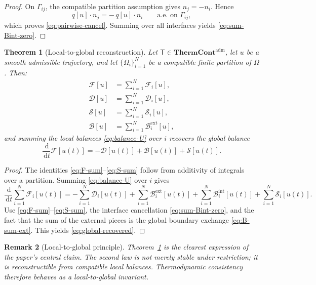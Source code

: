 \documentclass[11pt]{article}
\newtheorem{theorem}{Theorem}[section]
\newtheorem{remark}[theorem]{Remark}
\newcommand{\Om}{\Omega}
\newcommand{\dd}{\,\mathrm{d}}
\newcommand{\F}{\mathcal{F}}
\newcommand{\Diss}{\mathcal{D}}
\newcommand{\Bnd}{\mathcal{B}}
\newcommand{\Src}{\mathcal{S}}
\newcommand{\ThermAdm}{\mathbf{ThermCont}^{\mathrm{adm}}}
\begin{document}
\begin{proof}
On \(\Gamma_{ij}\), the compatible partition assumption gives \(n_j=-n_i\). Hence
\[
q[u]\cdot n_j = -\,q[u]\cdot n_i
\qquad \text{a.e. on }\Gamma_{ij},
\]
which proves \eqref{eq:pairwise-cancel}. Summing over all interfaces yields
\eqref{eq:sum-Bint-zero}.
\end{proof}

\begin{theorem}[Local-to-global reconstruction]\label{thm:local-to-global}
Let \(\mathsf{T}\in\ThermAdm\), let \(u\) be a smooth admissible trajectory, and let
\(\{\Om_i\}_{i=1}^N\) be a compatible finite partition of \(\Om\). Then:
\begin{align}
\F[u] &= \sum_{i=1}^N \F_i[u],\label{eq:F-sum}\\
\Diss[u] &= \sum_{i=1}^N \Diss_i[u],\label{eq:D-sum}\\
\Src[u] &= \sum_{i=1}^N \Src_i[u],\label{eq:S-sum}\\
\Bnd[u] &= \sum_{i=1}^N \Bnd_i^{\mathrm{ext}}[u],\label{eq:B-sum-ext}
\end{align}
and summing the local balances \eqref{eq:balance-U} over \(i\) recovers the global
balance
\begin{equation}\label{eq:global-recovered}
\frac{\dd}{\dd t}\F[u(t)]
=
-\Diss[u(t)] + \Bnd[u(t)] + \Src[u(t)].
\end{equation}
\end{theorem}

\begin{proof}
The identities \eqref{eq:F-sum}--\eqref{eq:S-sum} follow from additivity of
integrals over a partition. Summing \eqref{eq:balance-U} over \(i\) gives
\[
\frac{\dd}{\dd t}\sum_{i=1}^N \F_i[u(t)]
=
-\sum_{i=1}^N \Diss_i[u(t)]
+\sum_{i=1}^N \Bnd_i^{\mathrm{ext}}[u(t)]
+\sum_{i=1}^N \Bnd_i^{\mathrm{int}}[u(t)]
+\sum_{i=1}^N \Src_i[u(t)].
\]
Use \eqref{eq:F-sum}--\eqref{eq:S-sum}, the interface cancellation
\eqref{eq:sum-Bint-zero}, and the fact that the sum of the external pieces is the
global boundary exchange \eqref{eq:B-sum-ext}. This yields
\eqref{eq:global-recovered}.
\end{proof}

\begin{remark}[Local-to-global principle]
Theorem~\ref{thm:local-to-global} is the clearest expression of the paper's central
claim. The second law is not merely stable under restriction; it is reconstructible
from compatible local balances. Thermodynamic consistency therefore behaves as a
local-to-global invariant.
\end{remark}
\end{document}
